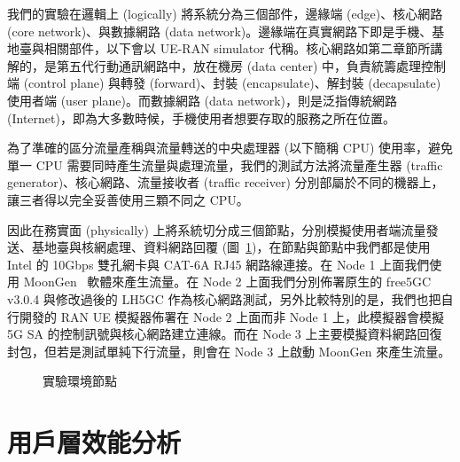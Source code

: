 我們的實驗在邏輯上 (logically) 將系統分為三個部件，邊緣端 (edge)、核心網路 (core network)、與數據網路 (data network)。邊緣端在真實網路下即是手機、基地臺與相關部件，以下會以 UE-RAN simulator 代稱。核心網路如第二章節所講解的，是第五代行動通訊網路中，放在機房 (data center) 中，負責統籌處理控制端 (control plane) 與轉發 (forward)、封裝 (encapsulate)、解封裝 (decapsulate) 使用者端 (user plane)。而數據網路 (data network)，則是泛指傳統網路 (Internet)，即為大多數時候，手機使用者想要存取的服務之所在位置。

為了準確的區分流量產稱與流量轉送的中央處理器 (以下簡稱 CPU) 使用率，避免單一 CPU 需要同時產生流量與處理流量，我們的測試方法將流量產生器 (traffic generator)、核心網路、流量接收者 (traffic receiver) 分別部屬於不同的機器上，讓三者得以完全妥善使用三顆不同之 CPU。

因此在務實面 (physically) 上將系統切分成三個節點，分別模擬使用者端流量發送、基地臺與核網處理、資料網路回覆 (圖~\ref{fig:eva_node})，在節點與節點中我們都是使用 Intel 的 10Gbps 雙孔網卡與 CAT-6A RJ45 網路線連接。在 Node 1 上面我們使用 MoonGen~\cite{paper.MoonGen} 軟體來產生流量。在 Node 2 上面我們分別佈署原生的 free5GC v3.0.4 與修改過後的 LH5GC 作為核心網路測試，另外比較特別的是，我們也把自行開發的 RAN UE 模擬器佈署在 Node 2 上面而非 Node 1 上，此模擬器會模擬 5G SA 的控制訊號與核心網路建立連線。而在 Node 3 上主要模擬資料網路回復封包，但若是測試單純下行流量，則會在 Node 3 上啟動 MoonGen 來產生流量。

\begin{figure}[htbp]
    \centering
    \caption[實驗環境節點]{{\footnotesize 實驗環境節點}}
    \label{fig:eva_node}
\end{figure}

\section{用戶層效能分析}
\label{sec:up_evaluation}

